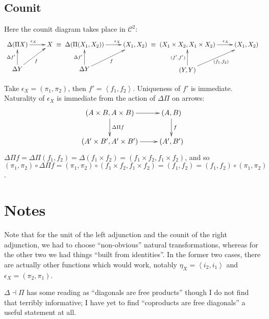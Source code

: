 \documentclass[letterpaper]{article}
\newcommand{\ang}[1]{\left\langle{#1}\right\rangle}
\begin{document}
\subsection{Counit}

Here the counit diagram takes place in $\mathcal{C}^2$:
\[ \xymatrix{
	\Delta (\Pi X) \ar[r]^{\epsilon_X} & X \\
    \Delta Y \ar[u]^{\Delta f'} \ar[ur]_{f}
} \equiv \xymatrix {
	\Delta (\Pi (X_1,X_2)) \ar[r]^(.65){\epsilon_X} & (X_1, X_2) \\
    \Delta Y \ar[u]^{\Delta f'} \ar[ur]_{f}
} \equiv \xymatrix {
	(X_1 \times X_2, X_1 \times X_2) \ar[r]^(.65){\epsilon_X} & (X_1, X_2) \\
    (Y,Y) \ar[u]^{(f',f')} \ar[ur]_{(f_1,f_2)}
}  \]

Take $\epsilon_X = (\pi_1, \pi_2)$, then $f' = \ang{f_1, f_2}$.  Uniqueness of
$f'$ is immediate.  Naturality of $\epsilon_X$ is immediate from the action of
$\Delta\Pi$ on arrows:
\[ \xymatrix{
	(A \times B, A \times B) \ar[r] \ar[d]^{\Delta \Pi f} & (A, B) \ar[d]^{f} \\
	(A' \times B', A' \times B') \ar[r] & (A', B')
} \]
$\Delta \Pi f = \Delta \Pi (f_1,f_2) = \Delta (f_1 \times f_2) = (f_1 \times
f_2, f_1 \times f_2)$, and so
$(\pi_1, \pi_2) \circ \Delta \Pi f = (\pi_1, \pi_2) \circ (f_1 \times
f_2, f_1 \times f_2) = (f_1, f_2) = (f_1,f_2) \circ (\pi_1, \pi_2)$.

\section{Notes}

Note that for the unit of the left adjunction and the counit of the right
adjunction, we had to choose ``non-obvious'' natural transformations,
whereas for the other two we had things ``built from identities''.  In the
former two cases, there are actually other functions which would work,
notably $\eta_X = \ang{i_2, i_1}$ and $\epsilon_X = (\pi_2,\pi_1)$.

$\Delta \dashv \Pi$ has some reading as ``diagonals are free products''
though I do not find that terribly informative; I have yet to find
``coproducts are free diagonals'' a useful statement at all.
\end{document}
